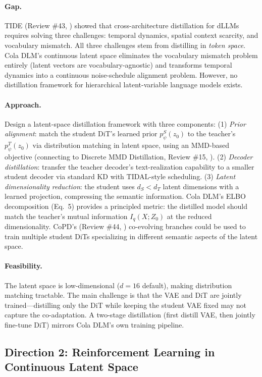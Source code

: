 \documentclass[11pt]{article}
\begin{document}
\paragraph{Gap.}
TIDE (Review \#43, \cite{tide}) showed that cross-architecture distillation for dLLMs requires solving three challenges: temporal dynamics, spatial context scarcity, and vocabulary mismatch. All three challenges stem from distilling in \emph{token space}. Cola DLM's continuous latent space eliminates the vocabulary mismatch problem entirely (latent vectors are vocabulary-agnostic) and transforms temporal dynamics into a continuous noise-schedule alignment problem. However, no distillation framework for hierarchical latent-variable language models exists.

\paragraph{Approach.}
Design a latent-space distillation framework with three components: (1) \emph{Prior alignment}: match the student DiT's learned prior $p_\psi^S(z_0)$ to the teacher's $p_\psi^T(z_0)$ via distribution matching in latent space, using an MMD-based objective (connecting to Discrete MMD Distillation, Review \#15, \cite{discretemmd}). (2) \emph{Decoder distillation}: transfer the teacher decoder's text-realization capability to a smaller student decoder via standard KD with TIDAL-style scheduling. (3) \emph{Latent dimensionality reduction}: the student uses $d_S < d_T$ latent dimensions with a learned projection, compressing the semantic information. Cola DLM's ELBO decomposition (Eq.\ 5) provides a principled metric: the distilled model should match the teacher's mutual information $I_q(X; Z_0)$ at the reduced dimensionality. CoPD's (Review \#44, \cite{copd}) co-evolving branches could be used to train multiple student DiTs specializing in different semantic aspects of the latent space.

\paragraph{Feasibility.}
The latent space is low-dimensional ($d = 16$ default), making distribution matching tractable. The main challenge is that the VAE and DiT are jointly trained---distilling only the DiT while keeping the student VAE fixed may not capture the co-adaptation. A two-stage distillation (first distill VAE, then jointly fine-tune DiT) mirrors Cola DLM's own training pipeline.

\subsection{Direction 2: Reinforcement Learning in Continuous Latent Space}
\end{document}
